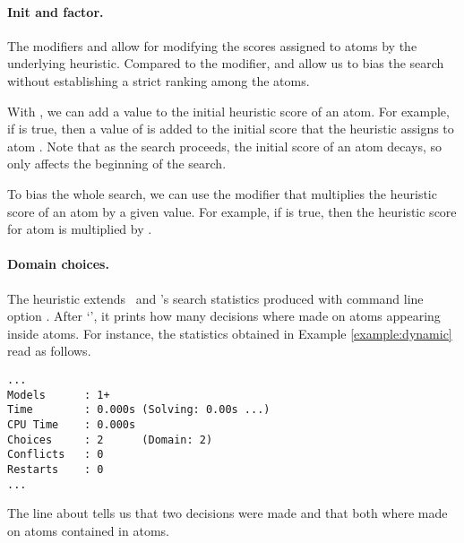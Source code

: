 \paragraph{Init and factor.}

The modifiers  and  allow for modifying the scores assigned to atoms by the underlying  heuristic.
Compared to the  modifier, 
 and  allow us to bias the search without establishing a strict ranking among the atoms.

With , we can add a value to the initial heuristic score of an atom.
For example, if  is true, then a value of  is added to
the initial score that the heuristic assigns to atom .
Note that as the search proceeds, the initial score of an atom decays, 
so  only affects the beginning of the search.

To bias the whole search, we can use the  modifier
that multiplies the heuristic score of an atom by a given value.
For example, if  is true, 
then the heuristic score for atom  is multiplied by .

\paragraph{Domain choices.}

The  heuristic extends \clasp\ and \clingo's search statistics produced with command line option .
After `', it prints how many decisions where made on atoms appearing inside  atoms.
%
For instance, the statistics obtained in Example \ref{example:dynamic} read as follows.
\begin{lstlisting}[numbers=none]
...
Models      : 1+
Time        : 0.000s (Solving: 0.00s ...)
CPU Time    : 0.000s
Choices     : 2      (Domain: 2)
Conflicts   : 0
Restarts    : 0
...
\end{lstlisting}
The line about  tells us that two decisions were made 
and that both where made on atoms contained in  atoms.

